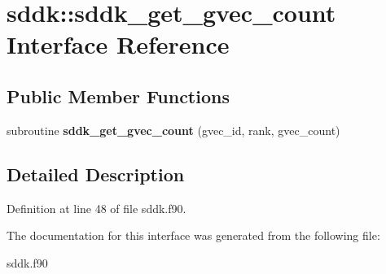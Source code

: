 \hypertarget{interfacesddk_1_1sddk__get__gvec__count}{}\section{sddk\+:\+:sddk\+\_\+get\+\_\+gvec\+\_\+count Interface Reference}
\label{interfacesddk_1_1sddk__get__gvec__count}
\subsection*{Public Member Functions}
\begin{DoxyCompactItemize}
\item 
\hypertarget{interfacesddk_1_1sddk__get__gvec__count_a0a75aa9c2c2ef8b0d2bd29e3f00a7a22}{}subroutine {\bfseries sddk\+\_\+get\+\_\+gvec\+\_\+count} (gvec\+\_\+id, rank, gvec\+\_\+count)\label{interfacesddk_1_1sddk__get__gvec__count_a0a75aa9c2c2ef8b0d2bd29e3f00a7a22}

\end{DoxyCompactItemize}


\subsection{Detailed Description}


Definition at line 48 of file sddk.\+f90.



The documentation for this interface was generated from the following file\+:\begin{DoxyCompactItemize}
\item 
sddk.\+f90\end{DoxyCompactItemize}
